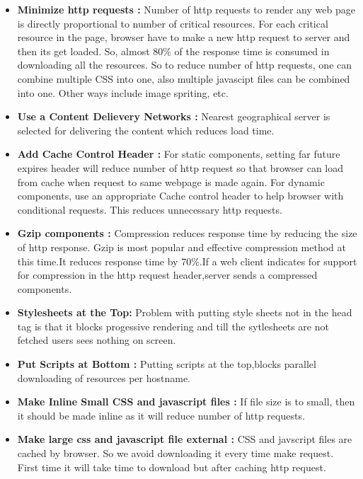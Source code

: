 \documentclass[conference]{IEEEtran}
\begin{document}
\begin{itemize}
\item \textbf{Minimize http requests :}
Number of http requests to render any web page is directly proportional to
number of critical resources.
For each critical resource in the page, browser have to make a new http request 
to server and then its get loaded. So, almost 80\% of the response time is
consumed in downloading all the resources. So to reduce number of http
requests, one can combine multiple CSS into one, also multiple javascipt files can
be combined into one. Other ways include image spriting, etc.

\item \textbf{Use a Content Delievery Networks :}
Nearest geographical server is selected for delivering the content which reduces load time.

\item \textbf{Add Cache Control Header :}
For static components, setting far future expires header will reduce number of http request
so that browser can load from cache when request to same webpage is made again.
For dynamic components, use an appropriate Cache control header to help browser
with conditional requests. This reduces unnecessary http requests.

\item \textbf{Gzip components :}
Compression reduces response time by reducing the size of http response.
Gzip is most popular and effective compression method at this time.It reduces
response time by 70\%.If a web client indicates for support for compression in
the http request header,server sends a compressed components.

\item \textbf{Stylesheets at the Top: }
Problem with putting style sheets not in the head tag is that it blocks
progessive rendering and till the sytlesheets are not fetched users sees nothing
on screen.

\item \textbf{Put Scripts at Bottom :}
Putting scripts at the top,blocks parallel downloading of resources per
hostname.

\item \textbf{Make Inline Small CSS and javascript files :}
If file size is to small, then it should be made inline as it will reduce number
of http requests.

\item \textbf{Make large css and javascript file external :}
CSS and javscript files are cached by browser. So we avoid downloading it every time make request.
First time it will take time to download but after caching http request.


\end{itemize}
\end{document}
